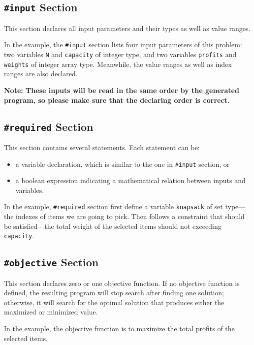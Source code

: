 \documentclass{report}
\begin{document}
\subsection{\texttt{\#input} Section}

This section declares all input parameters and their types as well as value ranges.

In the example, the \texttt{\#input} section lists four input parameters of this problem: two variables \texttt{N} and \texttt{capacity} of integer type, and two variables \texttt{profits} and \texttt{weights} of integer array type. Meanwhile, the value ranges as well as index ranges are also declared.

\textbf{Note: These inputs will be read in the same order by the generated program, so please make sure that the declaring order is correct.}

\subsection{\texttt{\#required} Section}

This section contains several statements. Each statement can be:
\begin{itemize}
    \item a variable declaration, which is similar to the one in \texttt{\#input} section, or
    \item a boolean expression indicating a mathematical relation between inputs and variables.
\end{itemize}

In the example, \texttt{\#required} section first define a variable \texttt{knapsack} of set type---the indexes of items we are going to pick. Then follows a constraint that should be satisfied---the total weight of the selected items should not exceeding \texttt{capacity}.

\subsection{\texttt{\#objective} Section}

This section declares zero or one objective function. If no objective function is defined, the resulting program will stop search after finding one solution; otherwise, it will search for the optimal solution that produces either the maximized or minimized value.

In the example, the objective function is to maximize the total profits of the selected items.
\end{document}
